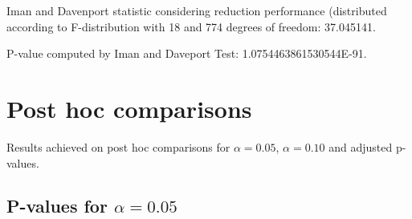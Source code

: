 \documentclass[a4paper,10pt]{article}
\begin{document}
\begin{landscape}
Iman and Davenport statistic considering reduction performance (distributed according to F-distribution with 18 and 774 degrees of freedom: 37.045141.

P-value computed by Iman and Daveport Test: 1.0754463861530544E-91.\newline



\pagebreak

\section{Post hoc comparisons}

Results achieved on post hoc comparisons for $\alpha = 0.05$, $\alpha = 0.10$ and adjusted p-values.

\subsection{P-values for $\alpha=0.05$}


\end{landscape}
\end{document}
